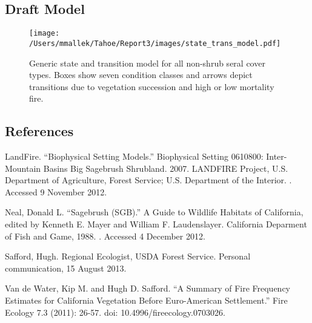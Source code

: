 \subsection*{Draft Model}
\begin{figure}[htbp]
\centering
\texttt{[image: /Users/mmallek/Tahoe/Report3/images/state\_trans\_model.pdf]}
\caption{Generic state and transition model for all non-shrub seral cover types. Boxes show seven condition classes and arrows depict transitions due to vegetation succession and high or low mortality fire.} 
\label{sage_transmodel}
\end{figure}

\clearpage
\subsection*{References}
\begin{hangparas}{.25in}{1} 
LandFire. ``Biophysical Setting Models.'' Biophysical Setting 0610800: Inter-Mountain Basins Big Sagebrush Shrubland. 2007. LANDFIRE Project, U.S. Department of Agriculture, Forest Service; U.S. Department of the Interior. . Accessed 9 November 2012.

Neal, Donald L. ``Sagebrush (SGB).'' A Guide to Wildlife Habitats of California, edited by Kenneth E. Mayer and William F. Laudenslayer. California Deparment of Fish and Game, 1988. . Accessed 4 December 2012.

Safford, Hugh. Regional Ecologist, USDA Forest Service. Personal communication, 15 August 2013.

Van de Water, Kip M. and Hugh D. Safford. ``A Summary of Fire Frequency Estimates for California Vegetation Before Euro-American Settlement.'' Fire Ecology 7.3 (2011): 26-57. doi: 10.4996/fireecology.0703026.
\end{hangparas}

